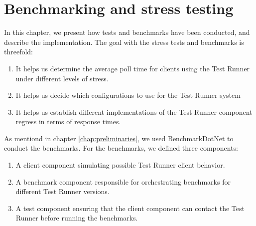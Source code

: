 \section{Benchmarking and stress testing} \label{chap:Benchmarking}
In this chapter, we present how tests and benchmarks have been conducted, and describe the implementation.
The goal with the stress tests and benchmarks is threefold:
\begin{enumerate}
\item It helps us determine the average poll time for clients using the Test Runner under different levels of stress.
\item It helps us decide which configurations to use for the Test Runner system
\item It helps us establish different implementations of the Test Runner component regress in terms of response times.
\end{enumerate}
As mentiond in chapter \ref{chap:preliminaries}, we used BenchmarkDotNet to conduct the benchmarks. 
For the benchmarks, we defined three components:
\begin{enumerate}
  \item A client component simulating possible Test Runner client behavior.
  \item A benchmark component responsible for orchestrating benchmarks for different Test Runner versions.
  \item A test component ensuring that the client component can contact the Test Runner before running the benchmarks.
\end{enumerate}


